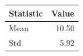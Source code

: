 \begin{tabular}{lr}
\toprule
Statistic & Value \\
\midrule
Mean & 10.50 \\
Std & 5.92 \\
\bottomrule
\end{tabular}
